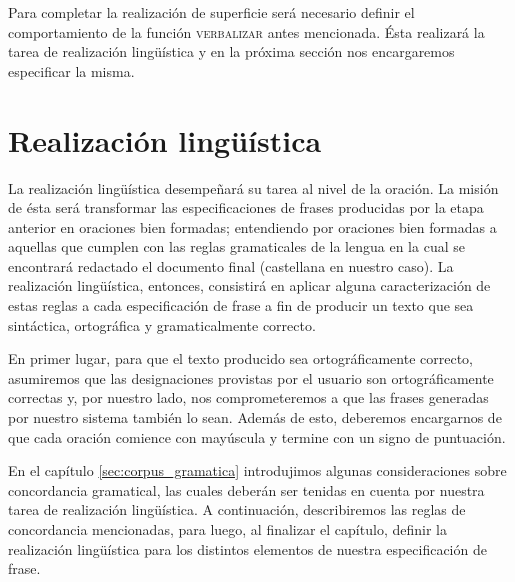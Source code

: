 Para completar la realización de superficie será necesario definir el comportamiento de la función \textsc{verbalizar} antes mencionada. Ésta realizará la tarea de realización lingüística y en la próxima sección nos encargaremos especificar la misma.





\section{Realización lingüística}
\label{cap:linguistic_realization}

La realización lingüística desempeñará su tarea al nivel de la oración. La misión de ésta será transformar las especificaciones de frases producidas por la etapa anterior en oraciones bien formadas; entendiendo por oraciones bien formadas a aquellas que cumplen con las reglas gramaticales de la lengua en la cual se encontrará redactado el documento final (castellana en nuestro caso). La realización lingüística, entonces, consistirá en aplicar alguna caracterización de estas reglas a cada especificación de frase a fin de producir un texto que sea sintáctica, ortográfica y gramaticalmente correcto.

En primer lugar, para que el texto producido sea ortográficamente correcto, asumiremos que las designaciones provistas por el usuario son ortográficamente correctas y, por nuestro lado, nos comprometeremos a que las frases generadas por nuestro sistema también lo sean. Además de esto, deberemos encargarnos de que cada oración comience con mayúscula y termine con un signo de puntuación.

En el capítulo \ref{sec:corpus_gramatica} introdujimos algunas consideraciones sobre concordancia gramatical, las cuales deberán ser tenidas en cuenta por nuestra tarea de realización lingüística. A continuación, describiremos las reglas de concordancia mencionadas, para luego, al finalizar el capítulo, definir la realización lingüística para los distintos elementos de nuestra especificación de frase.

